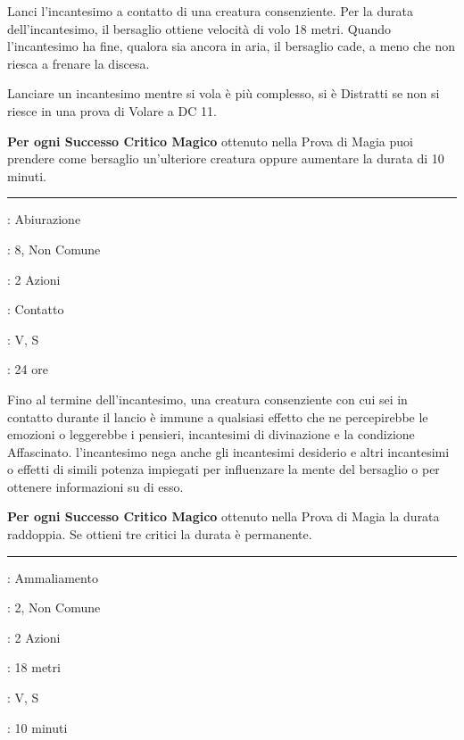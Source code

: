 \begin{multicols}{2}
Lanci l'incantesimo a contatto di una creatura consenziente. Per la durata dell'incantesimo, il bersaglio ottiene velocità di volo 18 metri. Quando l'incantesimo ha fine, qualora sia ancora in aria, il bersaglio cade, a meno che non riesca a frenare la discesa.

Lanciare un incantesimo mentre si vola è più complesso, si è Distratti se non si riesce in una prova di Volare a DC 11.

\textbf{Per ogni Successo Critico Magico} ottenuto nella Prova di Magia puoi prendere come bersaglio un'ulteriore creatura oppure aumentare la durata di 10 minuti.

\smallskip\noindent\rule{\linewidth}{2pt} \hypertarget{Scudo Mentale}{}\medskip{}
\noindent
\begin{description}[noitemsep, topsep=0pt, parsep=0pt, partopsep=0pt, leftmargin=0cm, labelwidth=2.8cm]
	\item[\textbf{Lista di Magia}]: Abiurazione
	\item[\textbf{Livello}]: 8, Non Comune
	\item[\textbf{T. di Lancio}]: 2 Azioni
	\item[\textbf{Gittata}]: Contatto
	\item[\textbf{Componenti}]: V, S
	\item[\textbf{Durata}]: 24 ore
\end{description}

Fino al termine dell'incantesimo, una creatura consenziente con cui sei in contatto durante il lancio è immune a qualsiasi effetto che ne percepirebbe le emozioni o leggerebbe i pensieri, incantesimi di divinazione e la condizione Affascinato. l'incantesimo nega anche gli incantesimi desiderio e altri incantesimi o effetti di simili potenza impiegati per
influenzare la mente del bersaglio o per ottenere informazioni su di esso.

\textbf{Per ogni Successo Critico Magico} ottenuto nella Prova di Magia la durata raddoppia. Se ottieni tre critici la durata è permanente.

\smallskip\noindent\rule{\linewidth}{2pt} \hypertarget{Zona di Verità}{}\medskip{}
\noindent
\begin{description}[noitemsep, topsep=0pt, parsep=0pt, partopsep=0pt, leftmargin=0cm, labelwidth=2.8cm]
	\item[\textbf{Lista di Magia}]: Ammaliamento
	\item[\textbf{Livello}]: 2, Non Comune
	\item[\textbf{T. di Lancio}]: 2 Azioni
	\item[\textbf{Gittata}]: 18 metri
	\item[\textbf{Componenti}]: V, S
	\item[\textbf{Durata}]: 10 minuti
\end{description}


\end{multicols}
